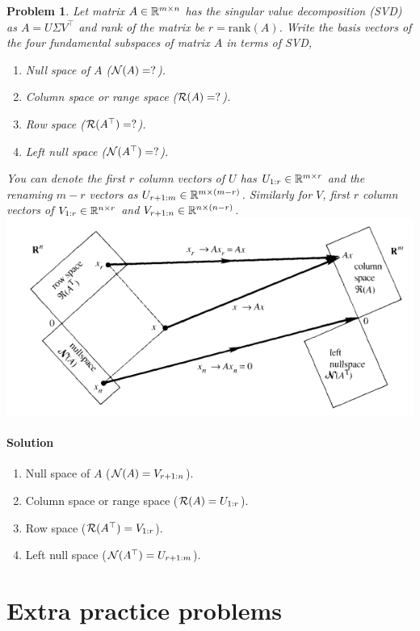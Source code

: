 \documentclass{article}
\newtheorem{prob}{Problem}
\begin{document}
\begin{prob}
  Let matrix $A \in \mathbb{R}^{m \times n}$ has the singular value decomposition
  (SVD) as $A = U\Sigma V^\top$ and rank of the matrix be $r = \text{rank}(A)$.
  Write the basis vectors of the four fundamental subspaces of matrix $A$ in
terms of SVD,
  \begin{enumerate}
    \item Null space of $A$ (${\cal N}(A) = ?$).
    \item Column space or range space (${\cal R}(A) = ?$).
    \item Row space (${\cal R}(A^\top) = ?$).
    \item Left null space (${\cal N}(A^\top) = ?$).
  \end{enumerate}
  You can denote the first $r$ column vectors of $U$ has $U_{1:r} \in \mathbb{R}^{m
    \times r}$ and the
  renaming $m-r$ vectors as $U_{r+1:m} \in \mathbb{R}^{m \times (m-r)}$. Similarly for
$V$, first $r$ column vectors of $V_{1:r} \in \mathbb{R}^{n \times r}$ and $V_{r+1:n}
\in \mathbb{R}^{n \times (n-r)}$.
\\
\includegraphics[width=0.7\linewidth]{media/four-fundamental-subspaces.png}
\end{prob}
\newpage
\paragraph*{Solution}

\begin{enumerate}
\item Null space of $A$ (${\cal N}(A) = V_{r+1:n}$).
\item Column space or range space (${\cal R}(A) = U_{1:r}$).
\item Row space (${\cal R}(A^\top) = V_{1:r}$).
\item Left null space (${\cal N}(A^\top) = U_{r+1:m}$).
\end{enumerate}

\section*{Extra practice problems}
\end{document}
